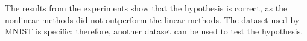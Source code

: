 The results from the experiments show that the hypothesis is correct, as the nonlinear methods did not outperform the linear methods. The dataset used by MNIST is specific; therefore, another dataset can be used to test the hypothesis. 






